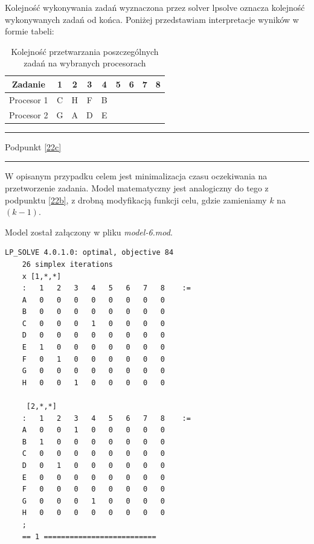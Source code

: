 \documentclass[
    12pt, %
]{../fphw}
\begin{document}
Kolejność wykonywania zadań wyznaczona przez solver lpsolve
oznacza kolejność wykonywanych zadań od końca.
Poniżej przedstawiam interpretacje wyników w formie tabeli:

\begin{table}[H]
    \centering
    \begin{tabular}{| c | c | c | c | c | c | c | c | c |}
        \hline
        Zadanie    & 1 & 2 & 3 & 4 & 5 & 6 & 7 & 8 \\
        \hline
        Procesor 1 & C & H & F & B &   &   &   &   \\
        \hline
        Procesor 2 & G & A & D & E &   &   &   &   \\
        \hline
    \end{tabular}
    \caption{Kolejność przetwarzania poszczególnych zadań na wybranych procesorach}
\end{table}

\newpage

\par\noindent\rule{\textwidth}{0.4pt}
Podpunkt \ref{22c}
\par\noindent\rule{\textwidth}{0.4pt}
W opisanym przypadku celem jest minimalizacja czasu oczekiwania na przetworzenie zadania.
Model matematyczny jest analogiczny do tego z podpunktu \ref{22b},
z drobną modyfikacją funkcji celu, gdzie zamieniamy \(k\) na \((k-1)\).


Model został załączony w pliku \textit{model-6.mod}.

\begin{lstlisting}[caption=Rozwiązanie znalezione solwerem lpsolve]
    LP_SOLVE 4.0.1.0: optimal, objective 84
    26 simplex iterations
    x [1,*,*]
    :   1   2   3   4   5   6   7   8    :=
    A   0   0   0   0   0   0   0   0
    B   0   0   0   0   0   0   0   0
    C   0   0   0   1   0   0   0   0
    D   0   0   0   0   0   0   0   0
    E   1   0   0   0   0   0   0   0
    F   0   1   0   0   0   0   0   0
    G   0   0   0   0   0   0   0   0
    H   0   0   1   0   0   0   0   0
    
     [2,*,*]
    :   1   2   3   4   5   6   7   8    :=
    A   0   0   1   0   0   0   0   0
    B   1   0   0   0   0   0   0   0
    C   0   0   0   0   0   0   0   0
    D   0   1   0   0   0   0   0   0
    E   0   0   0   0   0   0   0   0
    F   0   0   0   0   0   0   0   0
    G   0   0   0   1   0   0   0   0
    H   0   0   0   0   0   0   0   0
    ;
    == 1 ==========================
\end{lstlisting}
\end{document}
